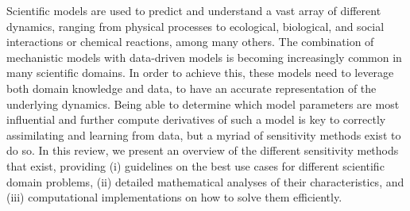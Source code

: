 Scientific models are used to predict and understand a vast array of different dynamics, ranging from physical processes to ecological, biological, and social interactions or chemical reactions, among many others. 
The combination of mechanistic models with data-driven models is becoming increasingly common in many scientific domains. 
In order to achieve this, these models need to leverage both domain knowledge and data, to have an accurate representation of the underlying dynamics. 
Being able to determine which model parameters are most influential and further compute derivatives of such a model is key to correctly assimilating and learning from data, but a myriad of sensitivity methods exist to do so. 
In this review, we present an overview of the different sensitivity methods that exist, providing (i) guidelines on the best use cases for different scientific domain problems, (ii) detailed mathematical analyses of their characteristics, and (iii) computational implementations on how to solve them efficiently. 
